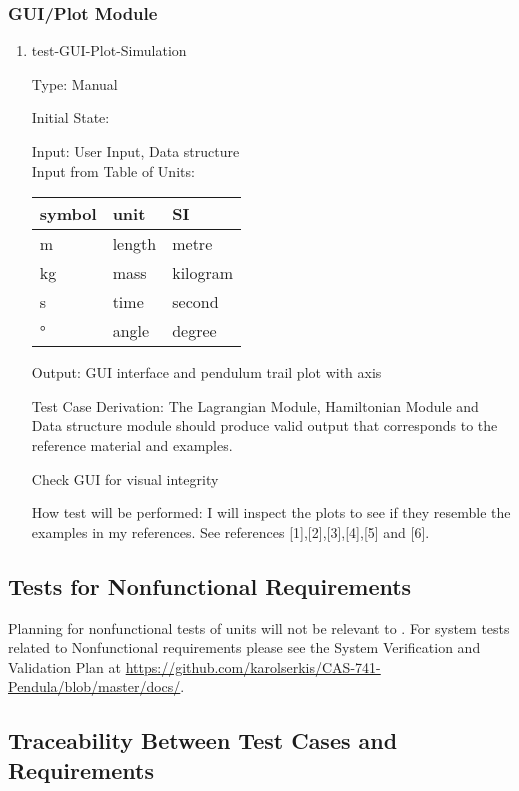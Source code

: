 \documentclass[12pt, titlepage]{article}
\begin{document}
\subsubsection{GUI/Plot Module} 

\begin{enumerate}				
	\item{test-GUI-Plot-Simulation\\}
	
	Type: Manual
	
	Initial State: 
	
	Input: User Input, Data structure\\
	Input from Table of Units:\\
  \noindent \begin{tabular}{l l l} 
    \toprule		
    \textbf{symbol} & \textbf{unit} & \textbf{SI}\\
    \midrule 
    \si{\metre} & length & metre\\
    \si{\kilogram} & mass & kilogram\\
    \si{\second} & time & second\\
    \si{\degree} & angle & degree\\
    \bottomrule
  \end{tabular}
	
	Output: GUI interface and pendulum trail plot with axis
	
	Test Case Derivation: The Lagrangian Module, Hamiltonian Module and Data structure module should produce valid
	output that corresponds to the reference material and examples.
	
	Check GUI for visual integrity
	
	How test will be performed: I will inspect the plots to see if 
	they resemble the examples in my references. See references [1],[2],[3],[4],[5] and [6].
\end{enumerate} 

\subsection{Tests for Nonfunctional Requirements}

Planning for nonfunctional tests of units will not be relevant to \progname. 
For system tests related to Nonfunctional requirements please see the System 
Verification and Validation Plan at 
\url{https://github.com/karolserkis/CAS-741-Pendula/blob/master/docs/}. 

\subsection{Traceability Between Test Cases and Requirements}
\end{document}

